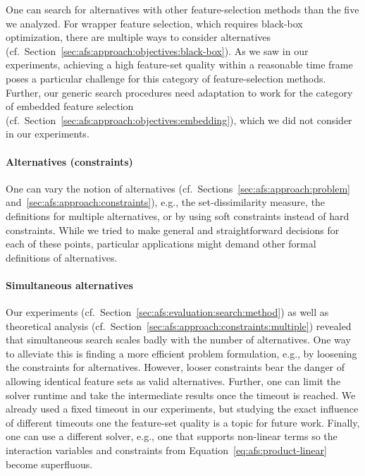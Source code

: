 \documentclass{article}
\theoremstyle{definition}
\begin{document}
One can search for alternatives with other feature-selection methods than the five we analyzed.
For wrapper feature selection, which requires black-box optimization, there are multiple ways to consider alternatives (cf.~Section~\ref{sec:afs:approach:objectives:black-box}).
As we saw in our experiments, achieving a high feature-set quality within a reasonable time frame poses a particular challenge for this category of feature-selection methods.
Further, our generic search procedures need adaptation to work for the category of embedded feature selection (cf.~Section~\ref{sec:afs:approach:objectives:embedding}), which we did not consider in our experiments.

\paragraph{Alternatives (constraints)}

One can vary the notion of alternatives (cf.~Sections~\ref{sec:afs:approach:problem} and~\ref{sec:afs:approach:constraints}), e.g., the set-dissimilarity measure, the definitions for multiple alternatives, or by using soft constraints instead of hard constraints.
While we tried to make general and straightforward decisions for each of these points, particular applications might demand other formal definitions of alternatives.

\paragraph{Simultaneous alternatives}

Our experiments (cf.~Section~\ref{sec:afs:evaluation:search:method}) as well as theoretical analysis (cf.~Section~\ref{sec:afs:approach:constraints:multiple}) revealed that simultaneous search scales badly with the number of alternatives.
One way to alleviate this is finding a more efficient problem formulation, e.g., by loosening the constraints for alternatives.
However, looser constraints bear the danger of allowing identical feature sets as valid alternatives.
Further, one can limit the solver runtime and take the intermediate results once the timeout is reached.
We already used a fixed timeout in our experiments, but studying the exact influence of different timeouts one the feature-set quality is a topic for future work.
Finally, one can use a different solver, e.g., one that supports non-linear terms so the interaction variables and constraints from Equation~\ref{eq:afs:product-linear} become superfluous.
\end{document}
